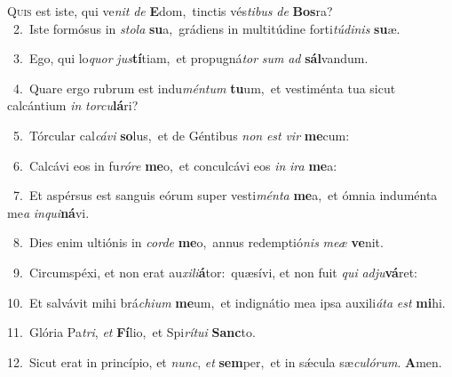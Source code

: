 \lettrine{\initial\textcolor{\initialcolor}{Q}}{uis} est iste, qui ve\textit{nit} \textit{de} \textbf{E}\-dom,~\star tinctis vés\-\textit{ti}\-\textit{bus} \textit{de} \textbf{Bos}\-ra?\\
{\numbfont\textcolor{\numbcolor}{~2.}}~Iste formósus in \textit{sto}\-\textit{la} \textbf{su}\-a,~\star grádiens in multitúdine forti\-\textit{tú}\-\textit{di}\textit{nis} \textbf{su}\-æ.\par
{\numbfont\textcolor{\numbcolor}{~3.}}~Ego, qui lo\textit{quor} \textit{jus}\-\textbf{tí}tiam,~\star et propugná\textit{tor} \textit{sum} \textit{ad} \textbf{sál}\-vandum.\par
{\numbfont\textcolor{\numbcolor}{~4.}}~Quare ergo rubrum est indu\-\textit{mén}\-\textit{tum} \textbf{tu}\-um,~\star et vestiménta tua sicut calcántium \textit{in} \textit{tor}\-\textit{cu}\textbf{lá}ri?\par
{\numbfont\textcolor{\numbcolor}{~5.}}~Tórcular cal\-\textit{cá}\-\textit{vi} \textbf{so}\-lus,~\star et de Géntibus \textit{non} \textit{est} \textit{vir} \textbf{me}\-cum:\par
{\numbfont\textcolor{\numbcolor}{~6.}}~Calcávi eos in fu\-\textit{ró}\-\textit{re} \textbf{me}\-o,~\star et conculcávi eos \textit{in} \textit{i}\-\textit{ra} \textbf{me}\-a:\par
{\numbfont\textcolor{\numbcolor}{~7.}}~Et aspérsus est sanguis eórum super vesti\-\textit{mén}\-\textit{ta} \textbf{me}\-a,~\star et ómnia induménta me\textit{a} \textit{in}\-\textit{qui}\textbf{ná}vi.\par
{\numbfont\textcolor{\numbcolor}{~8.}}~Dies enim ultiónis in \textit{cor}\-\textit{de} \textbf{me}\-o,~\star annus redemptió\textit{nis} \textit{me}\-\textit{æ} \textbf{ve}\-nit.\par
{\numbfont\textcolor{\numbcolor}{~9.}}~Circumspéxi, et non erat au\-\textit{xi}\-\textit{li}\textbf{á}tor:~\star quæsívi, et non fuit \textit{qui} \textit{ad}\-\textit{ju}\textbf{vá}ret:\par
{\numbfont\textcolor{\numbcolor}{10.}}~Et salvávit mihi brá\-\textit{chi}\-\textit{um} \textbf{me}\-um,~\star et indignátio mea ipsa auxili\-\textit{á}\-\textit{ta} \textit{est} \textbf{mi}\-hi.\par
{\numbfont\textcolor{\numbcolor}{11.}}~Glória Pa\-\textit{tri}\-, \textit{et} \textbf{Fí}\-lio,~\star et Spi\-\textit{rí}\-\textit{tu}\textit{i} \textbf{Sanc}\-to.\par
{\numbfont\textcolor{\numbcolor}{12.}}~Sicut erat in princípio, et \textit{nunc}\-, \textit{et} \textbf{sem}\-per,~\star et in sǽcula sæ\-\textit{cu}\-\textit{ló}\textit{rum}. \textbf{A}\-men.\par
